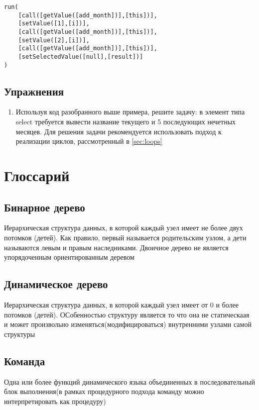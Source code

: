 \documentclass[10pt]{book}
\begin{document}
\begin{verbatim}
run(
    [call([getValue([add_month])],[this])],
    [setValue([1],[i])],
    [call([getValue([add_month])],[this])],
    [setValue([2],[i])],
    [call([getValue([add_month])],[this])],
    [setSelectedValue([null],[result])]
)
\end{verbatim}

\section{Упражнения}

        \begin{enumerate}
            \item Используя код разобранного выше примера, решите задачу: в элемент типа select требуется вывести название текущего и 5 последующих нечетных месяцев. Для решения задачи рекомендуется использовать подход к реализации циклов, рассмотренный в  \autoref{sec:loops}            
        \end{enumerate}
\chapter{Глоссарий}
    \section{Бинарное дерево}\label{sec:gloss:bintree}
        Иерархическая структура данных, в которой каждый узел имеет не более двух потомков (детей). Как правило, первый называется родительским узлом, а дети называются левым и правым наследниками. Двоичное дерево не является упорядоченным ориентированным деревом
    \section{Динамическое дерево}\label{sec:gloss:dyntree}
        Иерархическая структура данных, в которой каждый узел имеет от 0 и более потомков (детей). ОСобенностью структуру является то что она не статическаая и может произвольно изменяться(модифицироваться) внутренними узлами самой структуры
    \section{Команда}\label{sec:gloss:command}
        Одна или более функций динамического языка объединенных в последовательный блок выполнения(в рамках процедурного подхода команду можно интерпретировать как процедуру)
\end{document}
